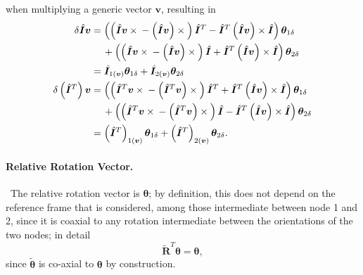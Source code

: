 \documentclass[10pt,fleqn,subeqn]{report}
\newcommand{\T}[1]{\bm{#1}}
\newcommand{\TT}[1]{\bm{#1}}
\begin{document}
when multiplying a generic vector $\T{v}$, resulting in
\begin{subequations}
\begin{align}
	\delta\hat{\T{I}} \T{v}
	&= \plbr{
		\plbr{
			\hat{\T{I}} \T{v} \times{}
			- \plbr{\hat{\T{I}} \T{v}} \times{}
		} \hat{\T{I}}^T
		- \hat{\T{I}}^T \plbr{\hat{\T{I}} \T{v}} \times \hat{\T{I}}
	} \T{\theta}_{1\delta}
		\nonumber \\
	& \mbox{\hspace{12pt}} + \plbr{
		\plbr{
			\hat{\T{I}} \T{v} \times{}
			- \plbr{\hat{\T{I}} \T{v}} \times{}
		} \hat{\T{I}}
		+ \hat{\T{I}}^T \plbr{\hat{\T{I}} \T{v}} \times \hat{\T{I}}
	} \T{\theta}_{2\delta}
		\nonumber \\
	&= \hat{\TT{I}}_{1\plbr{\T{v}}} \T{\theta}_{1\delta}
		+ \hat{\TT{I}}_{2\plbr{\T{v}}} \T{\theta}_{2\delta} \\
	\delta\plbr{\hat{\T{I}}^T} \T{v}
	&= \plbr{
		\plbr{
			\hat{\T{I}}^T \T{v} \times{}
			- \plbr{\hat{\T{I}}^T \T{v}} \times{}
		} \hat{\T{I}}^T
		+ \hat{\T{I}}^T \plbr{\hat{\T{I}} \T{v}} \times \hat{\T{I}}
	} \T{\theta}_{1\delta}
		\nonumber \\
	& \mbox{\hspace{12pt}} + \plbr{
		\plbr{
			\hat{\T{I}}^T \T{v} \times{}
			- \plbr{\hat{\T{I}}^T \T{v}} \times{}
		} \hat{\T{I}}
		- \hat{\T{I}}^T \plbr{\hat{\T{I}} \T{v}} \times \hat{\T{I}}
	} \T{\theta}_{2\delta}
		\nonumber \\
	&= \plbr{\hat{\TT{I}}^T}_{1\plbr{\T{v}}} \T{\theta}_{1\delta}
		+ \plbr{\hat{\TT{I}}^T}_{2\plbr{\T{v}}} \T{\theta}_{2\delta} .
\end{align}
\end{subequations}


\paragraph{Relative Rotation Vector.} \
The relative rotation vector is $\T{\theta}$; by definition, this does not depend
on the reference frame that is considered, among those intermediate 
between node 1 and 2, since it is coaxial to any rotation intermediate 
between the orientations of the two nodes; in detail
\begin{equation}
	\tilde{\T{R}}^T \T{\theta} = \T{\theta} ,
\end{equation}
since $\tilde{\T{\theta}}$ is co-axial to $\T{\theta}$
by construction.
\end{document}
